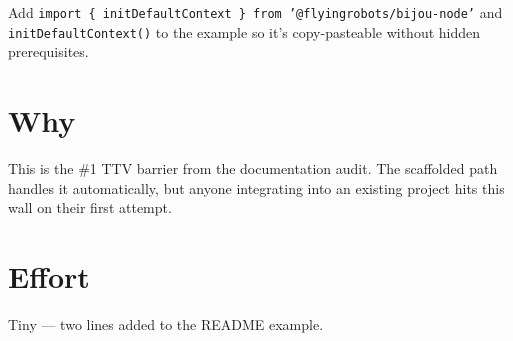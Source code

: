 Add \texttt{i\allowbreak{}m\allowbreak{}p\allowbreak{}o\allowbreak{}r\allowbreak{}t\allowbreak{} \allowbreak{}\{\allowbreak{} \allowbreak{}i\allowbreak{}n\allowbreak{}i\allowbreak{}t\allowbreak{}D\allowbreak{}e\allowbreak{}f\allowbreak{}a\allowbreak{}u\allowbreak{}l\allowbreak{}t\allowbreak{}C\allowbreak{}o\allowbreak{}n\allowbreak{}t\allowbreak{}e\allowbreak{}x\allowbreak{}t\allowbreak{} \allowbreak{}\}\allowbreak{} \allowbreak{}f\allowbreak{}r\allowbreak{}o\allowbreak{}m\allowbreak{} \allowbreak{}'\allowbreak{}@\allowbreak{}f\allowbreak{}l\allowbreak{}y\allowbreak{}i\allowbreak{}n\allowbreak{}g\allowbreak{}r\allowbreak{}o\allowbreak{}b\allowbreak{}o\allowbreak{}t\allowbreak{}s\allowbreak{}/\allowbreak{}b\allowbreak{}i\allowbreak{}j\allowbreak{}o\allowbreak{}u\allowbreak{}-\allowbreak{}n\allowbreak{}o\allowbreak{}d\allowbreak{}e\allowbreak{}'} and \texttt{i\allowbreak{}n\allowbreak{}i\allowbreak{}t\allowbreak{}D\allowbreak{}e\allowbreak{}f\allowbreak{}a\allowbreak{}u\allowbreak{}l\allowbreak{}t\allowbreak{}C\allowbreak{}o\allowbreak{}n\allowbreak{}t\allowbreak{}e\allowbreak{}x\allowbreak{}t\allowbreak{}(\allowbreak{})} to the example so it's copy-pasteable without hidden prerequisites.

\section{Why}\label{record-346-why}

This is the \#1 TTV barrier from the documentation audit. The scaffolded path handles it automatically, but anyone integrating into an existing project hits this wall on their first attempt.

\section{Effort}\label{record-346-effort}

Tiny --- two lines added to the README example.

